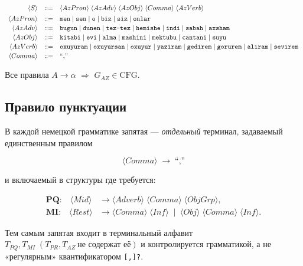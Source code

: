 \documentclass[areasetadvanced]{scrartcl}
\newcommand{\term}[1]{\text{\texttt{#1}}}
\begin{document}
\[
\begin{array}{rcl}
\langle S\rangle &::=&
  \langle AzPron\rangle\;
  \langle AzAdv\rangle\;
  \langle AzObj\rangle\;
  \langle Comma\rangle\;
  \langle AzVerb\rangle \\[4pt]

\langle AzPron\rangle &::=&
  \term{men}\mid\term{sen}\mid\term{o}\mid
  \term{biz}\mid\term{siz}\mid\term{onlar} \\[2pt]

\langle AzAdv\rangle &::=&
  \term{bugun}\mid\term{dunen}\mid\term{tez-tez}\mid
  \term{hemishe}\mid\term{indi}\mid\term{sabah}\mid\term{axsham} \\[2pt]

\langle AzObj\rangle &::=&
  \term{kitabi}\mid\term{evi}\mid\term{alma}\mid
  \term{mashini}\mid\term{mektubu}\mid\term{cantani}\mid\term{suyu} \\[2pt]

\langle AzVerb\rangle &::=&
  \term{oxuyuram}\mid\term{oxuyursan}\mid\term{oxuyur}\mid
  \term{yaziram}\mid\term{gedirem}\mid\term{gorurem}\mid
  \term{aliram}\mid\term{sevirem} \\[2pt]

\langle Comma\rangle &::=& \text{``,''}
\end{array}
\]


Все правила $A\to\alpha$ $\Rightarrow$ $G_{AZ}\in\text{CFG}$.
\newpage
\subsection{Правило пунктуации}

В каждой немецкой грамматике запятая — \emph{отдельный} терминал,
задаваемый единственным правилом

\[
  \boxed{\;\langle\textit{Comma}\rangle\;\to\;\mbox{``,''}\;}
\]

и включаемый в структуры где требуется:

\[
\begin{aligned}
\textbf{PQ:}\quad
  \langle Mid\rangle &\to
        \langle Adverb\rangle
      \;\langle Comma\rangle\;
        \langle ObjGrp\rangle,\\[4pt]
\textbf{MI:}\quad
  \langle Rest\rangle &\to
        \langle Comma\rangle\;\langle Inf\rangle
      \;\mid\;
        \langle Obj\rangle\;
        \langle Comma\rangle\;
        \langle Inf\rangle.
\end{aligned}
\]

Тем самым запятая входит в терминальный алфавит
\(
T_{PQ},T_{MI}\;(T_{PR},T_{AZ}\ \text{не содержат её})
\)
и контролируется грамматикой, а не «регулярным»
квантификатором \verb|[,]?|.
\end{document}
